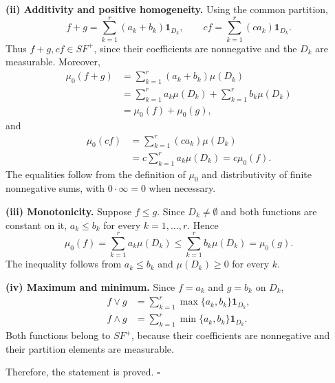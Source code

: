 \documentclass[10pt,a4paper]{article}
\begin{document}
\newpage
\textbf{(ii) Additivity and positive homogeneity.}
Using the common partition,
\[
f+g=\sum_{k=1}^{r}(a_k+b_k)\mathbf1_{D_k},\qquad
cf=\sum_{k=1}^{r}(ca_k)\mathbf1_{D_k}.
\]
Thus $f+g,cf\in SF^+$, since their coefficients are nonnegative and the $D_k$ are measurable. Moreover,
\[
\begin{aligned}
\mu_0(f+g)
&=\sum_{k=1}^{r}(a_k+b_k)\mu(D_k)\\
&=\sum_{k=1}^{r}a_k\mu(D_k)
 +\sum_{k=1}^{r}b_k\mu(D_k)\\
&=\mu_0(f)+\mu_0(g),
\end{aligned}
\]
and
\[
\begin{aligned}
\mu_0(cf)
&=\sum_{k=1}^{r}(ca_k)\mu(D_k)\\
&=c\sum_{k=1}^{r}a_k\mu(D_k)
=c\mu_0(f).
\end{aligned}
\]
The equalities follow from the definition of $\mu_0$ and distributivity of finite nonnegative sums, with $0\cdot\infty=0$ when necessary.

\textbf{(iii) Monotonicity.}
Suppose $f\le g$. Since $D_k\ne\emptyset$ and both functions are constant on it, $a_k\le b_k$ for every $k=1,\ldots,r$. Hence
\[
\mu_0(f)=\sum_{k=1}^{r}a_k\mu(D_k)
\le\sum_{k=1}^{r}b_k\mu(D_k)=\mu_0(g).
\]
The inequality follows from $a_k\le b_k$ and $\mu(D_k)\ge0$ for every $k$.

\textbf{(iv) Maximum and minimum.}
Since $f=a_k$ and $g=b_k$ on $D_k$,
\[
\begin{aligned}
f\vee g&=\sum_{k=1}^{r}\max\{a_k,b_k\}\mathbf1_{D_k},\\
f\wedge g&=\sum_{k=1}^{r}\min\{a_k,b_k\}\mathbf1_{D_k}.
\end{aligned}
\]
Both functions belong to $SF^+$, because their coefficients are nonnegative and their partition elements are measurable.

Therefore, the statement is proved. $\square$
\end{document}
